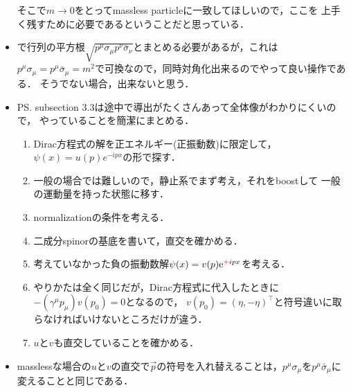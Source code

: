 \begin{itemize}
		そこで$m\to0$をとってmassless particleに一致してほしいので，ここを
		上手く残すために必要であるということだと思っている．
	\item {}で行列の平方根$\sqrt{p^{\mu}\sigma_{\mu} p^{\nu} \bar{\sigma}_{\nu}}$とまとめる必要があるが，これは$p^{\mu}\sigma_{\mu} = p^{\mu}\bar{\sigma}_{\mu}= m^2$で可換なので，同時対角化出来るのでやって良い操作である．
		そうでない場合，出来ないと思う．
	\item PS. subsection 3.3は途中で導出がたくさんあって全体像がわかりにくいので，
		やっていることを簡潔にまとめる．
		\begin{enumerate}
			\item Dirac方程式の解を正エネルギー(正振動数)に限定して，$\psi(x) = u(p)e^{-ipx}$の形で探す．
			\item 一般の場合では難しいので，静止系でまず考え，それをboostして
				一般の運動量を持った状態に移す．
			\item normalizationの条件を考える．
			\item 二成分spinorの基底を書いて，直交を確かめる．
			\item 考えていなかった負の振動数解$\psi(x) = v(p)\mathrm{e}^{\textcolor{red}{+}ipx}$を考える．
			\item やりかたは全く同じだが，Dirac方程式に代入したときに$-(\gamma^{\mu}p_{\mu})v(p_0) = 0$となるので，
				$v(p_0)=(\eta, -\eta)^{\top}$と符号違いに取らなければいけないところだけが違う．
			\item $u$と$v$も直交していることを確かめる．
		\end{enumerate}
	\item masslessな場合の$u$と$v$の直交で$\vec{p}$の符号を入れ替えることは，$p^{\mu}\sigma_{\mu}$を$p^{\mu}\bar{\sigma}_{\mu}$に変えることと同じである．
\end{itemize}
